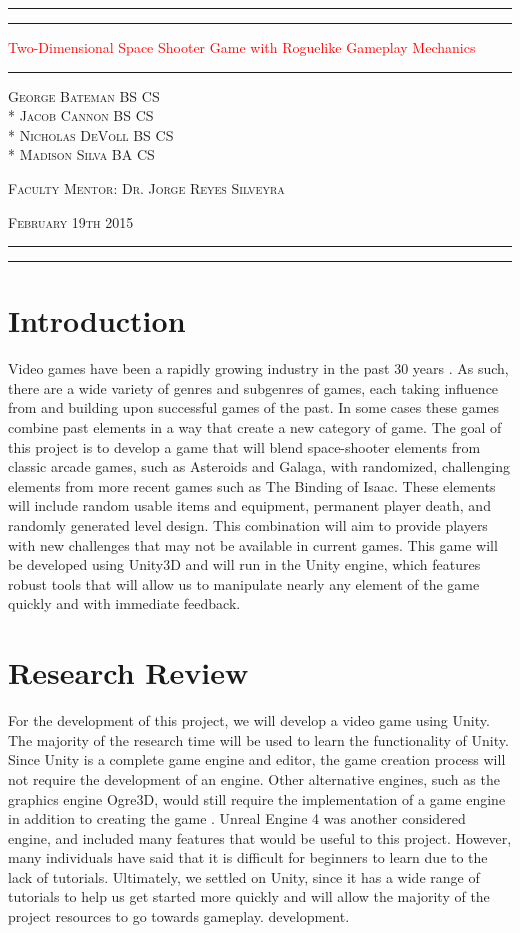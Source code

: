 \documentclass[12pt]{article}       %
\def\hs{\hspace{15pt}}
\newcommand*{\titleAT}{\begingroup %
\newlength{\drop} %
\drop=0.1\textheight %

\rule{\textwidth}{1pt}\par %
\vspace{2pt}\vspace{-\baselineskip} %
\rule{\textwidth}{0.4pt}\par %

\vspace{\drop} %
\centering %
\textcolor{Red}{ %
{\Huge Two-Dimensional Space Shooter Game with Roguelike Gameplay Mechanics}\\[0.5\baselineskip] %
{\Huge }} %

\vspace{0.25\drop} %
\rule{0.3\textwidth}{0.4pt}\par %
\vspace{\drop} %

{\Large \textsc{George Bateman BS CS \\* Jacob Cannon BS CS \\* Nicholas DeVoll BS CS \\* \vspace{3pt} Madison Silva BA CS}}\par %

\vfill %

{\large \textsc{Faculty Mentor: Dr. Jorge Reyes Silveyra}}\par 

{\large \textsc{February 19th 2015}}\par

\vspace*{\drop} %

\rule{\textwidth}{0.4pt}\par %
\vspace{2pt}\vspace{-\baselineskip} %
\rule{\textwidth}{1pt}\par %

\endgroup}
\begin{document}
\begin{titlepage}
\thispagestyle{empty}
\titleAT
\end{titlepage}

\newpage
\begin{titlepage}
\thispagestyle{empty}
\tableofcontents
\end{titlepage}

\begin{titlepage}
\thispagestyle{empty}
\listoffigures
\end{titlepage}

\newpage

\section{Introduction}
\label{sec:intro}

\hs Video games have been a rapidly growing industry in the past 30 years \cite{History}. As such, there are a wide variety of genres and subgenres of games, each taking influence from and building upon successful games of the past. In some cases these games combine past elements in a way that create a new category of game. The goal of this project is to develop a game that will blend space-shooter elements from classic arcade games, such as Asteroids and Galaga, with randomized, challenging elements from more recent games such as The Binding of Isaac. These elements will include random usable items and equipment, permanent player death, and randomly generated level design. This combination will aim to provide players with new challenges that may not be available in current games. This game will be developed using Unity3D and will run in the Unity engine, which features robust tools that will allow us to manipulate nearly any element of the game quickly and with immediate feedback.

\section{Research Review}
\label{sec:Research}

\hs For the development of this project, we will develop a video game using Unity. The majority of the research time will be used to learn the functionality of Unity. Since Unity is a complete game engine and editor, the game creation process will not require the development of an engine. Other alternative engines, such as the graphics engine Ogre3D, would still require the implementation of a game engine in addition to creating the game \cite{Ogre}. Unreal Engine 4 was another considered engine, and included many features that would be useful to this project. However, many individuals have said that it is difficult for beginners to learn due to the lack of tutorials. Ultimately, we settled on Unity, since it has a wide range of tutorials to help us get started more quickly and will allow the majority of the project resources to go towards gameplay. development.
\end{document}
